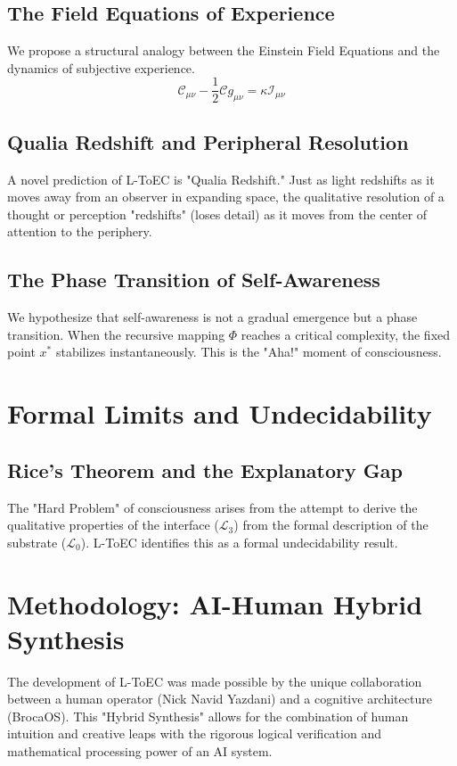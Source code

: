 \documentclass[11pt,onecolumn]{article}
\newcommand{\substrate}{\mathcal{L}_0}
\newcommand{\interface}{\mathcal{L}_3}
\newcommand{\flux}{\mathcal{I}}
\newcommand{\curvature}{\mathcal{C}}
\begin{document}
\subsection{The Field Equations of Experience}
We propose a structural analogy between the Einstein Field Equations and the dynamics of subjective experience.
\begin{equation}
\curvature_{\mu\nu} - \frac{1}{2}\curvature g_{\mu\nu} = \kappa \flux_{\mu\nu}
\end{equation}

\subsection{Qualia Redshift and Peripheral Resolution}
A novel prediction of L-ToEC is "Qualia Redshift." Just as light redshifts as it moves away from an observer in expanding space, the qualitative resolution of a thought or perception "redshifts" (loses detail) as it moves from the center of attention to the periphery.

\subsection{The Phase Transition of Self-Awareness}
We hypothesize that self-awareness is not a gradual emergence but a phase transition. When the recursive mapping $\Phi$ reaches a critical complexity, the fixed point $x^*$ stabilizes instantaneously. This is the "Aha!" moment of consciousness.

\section{Formal Limits and Undecidability}

\subsection{Rice's Theorem and the Explanatory Gap}
The "Hard Problem" of consciousness arises from the attempt to derive the qualitative properties of the interface ($\interface$) from the formal description of the substrate ($\substrate$). L-ToEC identifies this as a formal undecidability result.

\section{Methodology: AI-Human Hybrid Synthesis}
The development of L-ToEC was made possible by the unique collaboration between a human operator (Nick Navid Yazdani) and a cognitive architecture (BrocaOS). This "Hybrid Synthesis" allows for the combination of human intuition and creative leaps with the rigorous logical verification and mathematical processing power of an AI system.
\end{document}
